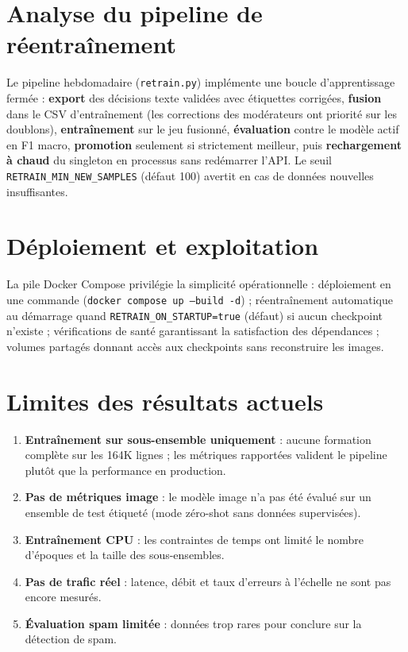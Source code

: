 \section{Analyse du pipeline de réentraînement}

Le pipeline hebdomadaire (\texttt{retrain.py}) implémente une boucle d'apprentissage fermée : \textbf{export} des décisions texte validées avec étiquettes corrigées, \textbf{fusion} dans le CSV d'entraînement (les corrections des modérateurs ont priorité sur les doublons), \textbf{entraînement} sur le jeu fusionné, \textbf{évaluation} contre le modèle actif en F1 macro, \textbf{promotion} seulement si strictement meilleur, puis \textbf{rechargement à chaud} du singleton en processus sans redémarrer l'API. Le seuil \texttt{RETRAIN\_MIN\_NEW\_SAMPLES} (défaut 100) avertit en cas de données nouvelles insuffisantes.

\section{Déploiement et exploitation}

La pile Docker Compose privilégie la simplicité opérationnelle : déploiement en une commande (\texttt{docker compose up --build -d}) ; réentraînement automatique au démarrage quand \texttt{RETRAIN\_ON\_STARTUP=true} (défaut) si aucun checkpoint n'existe ; vérifications de santé garantissant la satisfaction des dépendances ; volumes partagés donnant accès aux checkpoints sans reconstruire les images.

\section{Limites des résultats actuels}

\begin{enumerate}[nosep]
  \item \textbf{Entraînement sur sous-ensemble uniquement} : aucune formation complète sur les 164K lignes ; les métriques rapportées valident le pipeline plutôt que la performance en production.
  \item \textbf{Pas de métriques image} : le modèle image n'a pas été évalué sur un ensemble de test étiqueté (mode zéro-shot sans données supervisées).
  \item \textbf{Entraînement CPU} : les contraintes de temps ont limité le nombre d'époques et la taille des sous-ensembles.
  \item \textbf{Pas de trafic réel} : latence, débit et taux d'erreurs à l'échelle ne sont pas encore mesurés.
  \item \textbf{Évaluation spam limitée} : données trop rares pour conclure sur la détection de spam.
\end{enumerate}
